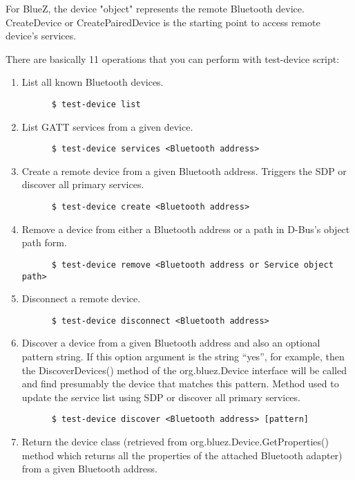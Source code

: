 \documentclass[11pt]{article}
\begin{document}
For BlueZ, the device "object" represents the remote Bluetooth device.
CreateDevice or CreatePairedDevice is the starting point to access
remote device's services.

There are basically 11 operations that you can perform with test-device script:
\begin{enumerate}
  \item List all known Bluetooth devices.
    \begin{verbatim}
      $ test-device list
    \end{verbatim}
  \item List GATT services from a given device.
    \begin{verbatim}
      $ test-device services <Bluetooth address>
    \end{verbatim}
  \item Create a remote device from a given Bluetooth address. Triggers the
	  SDP or discover all primary services.
    \begin{verbatim}
      $ test-device create <Bluetooth address>
    \end{verbatim}
  \item Remove a device from either a Bluetooth address or a path in
        D-Bus's object path form.
    \begin{verbatim}
      $ test-device remove <Bluetooth address or Service object path>
    \end{verbatim}
  \item Disconnect a remote device.
    \begin{verbatim}
      $ test-device disconnect <Bluetooth address>
    \end{verbatim}
  \item Discover a device from a given Bluetooth address and also an
        optional pattern string. If this option argument is the string
        ``yes'', for example, then the DiscoverDevices() method of the
        org.bluez.Device interface will be called and find presumably
        the device that matches this pattern. Method used to update the
	service list using SDP or discover all primary services.
    \begin{verbatim}
      $ test-device discover <Bluetooth address> [pattern]
    \end{verbatim}
  \item Return the device class (retrieved from
        org.bluez.Device.GetProperties() method which returns all the
        properties of the attached Bluetooth adapter) from a given
        Bluetooth address.

\end{enumerate}
\end{document}
